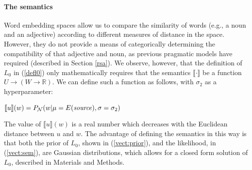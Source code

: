 \documentclass[9pt,twocolumn,twoside,lineno]{pnas-new}
\newcommand{\Listener}{L}
\newcommand{\QLONE}{\Listener_{{1}}^{{Q}}}
\begin{document}
			


	\paragraph{The semantics}



		Word embedding spaces allow us to compare the similarity of words (e.g., a noun and an adjective) according to different measures of distance in the space. However, they do not provide a means of categorically determining the compatibility of that adjective and noun, as previous pragmatic models have required (described in Section \ref{rsa}). We observe, however, that the definition of $L_0$ in (\ref{defl0}) only mathematically requires that the semantics $\llbracket \cdot \rrbracket$ be a function $U\to (W\to \mathbb{R})$. We can define such a function as follows, with $\sigma_2$ as a hyperparameter:
		\begin{examples}
		
		\item $\llbracket u\rrbracket(w) = P_{\mathcal{N}}(w\vert\mu=E(\textrm{\emph{source}}),\sigma=\sigma_2)$ \label{vect:sem}
		\end{examples}





		The value of $\llbracket u\rrbracket(w)$ is a real number which decreases with the Euclidean distance between $u$ and $w$. 
		The advantage of defining the semantics in this way is that both the prior of $L_0$, shown in (\ref{vect:prior}), and the likelihood, in (\ref{vect:sem}), are Gaussian distributions, which allows for a closed form solution of $L_0$, described in Materials and Methods. 
\end{document}
